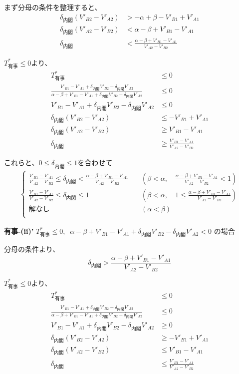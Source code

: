 \documentclass[main.tex]{subfiles}
\begin{document}
まず分母の条件を整理すると、
\begin{align*}
    \delta_{内閣}(V'_{B2} - V'_{A2}) &> -\alpha+\beta - V'_{B1}+V'_{A1} \\
    \delta_{内閣}(V'_{A2} - V'_{B2}) &< \alpha-\beta + V'_{B1}-V'_{A1}\\
    \delta_{内閣} &< \frac{\alpha-\beta + V'_{B1}-V'_{A1}}{V'_{A2} - V'_{B2}} 
\end{align*}

$T^*_{有事} \le 0$より、
\begin{align*}
    T^*_{有事} &\le 0 \\
    \frac{ V'_{B1} - V'_{A1} +\delta_{内閣}V'_{B2} - \delta_{内閣}V'_{A2} }{ \alpha-\beta + V'_{B1}-V'_{A1} + \delta_{内閣}V'_{B2} - \delta_{内閣}V'_{A2} } &\le 0 \\
    V'_{B1} - V'_{A1} +\delta_{内閣}V'_{B2} - \delta_{内閣}V'_{A2} &\le 0 \\
    \delta_{内閣}(V'_{B2} - V'_{A2}) &\le - V'_{B1} + V'_{A1}\\
    \delta_{内閣}(V'_{A2} - V'_{B2}) &\ge V'_{B1} - V'_{A1}\\
    \delta_{内閣} &\ge \frac{ V'_{B1} - V'_{A1} }{ V'_{A2} - V'_{B2} }
\end{align*}

これらと、$0 \le \delta_{内閣} \le 1$を合わせて
\begin{align*}
\begin{cases}
    \frac{ V'_{B1} - V'_{A1} }{ V'_{A2} - V'_{B2} } \le \delta_{内閣} <  \frac{\alpha-\beta + V'_{B1}-V'_{A1}}{V'_{A2} - V'_{B2}} \quad &(\beta < \alpha, \quad \frac{\alpha-\beta + V'_{B1}-V'_{A1}}{V'_{A2} - V'_{B2}} < 1) \\[1em]
    \frac{ V'_{B1} - V'_{A1} }{ V'_{A2} - V'_{B2} } \le \delta_{内閣} \le 1 \quad &(\beta < \alpha, \quad 1 \le \frac{\alpha-\beta + V'_{B1}-V'_{A1}}{V'_{A2} - V'_{B2}}) \\[1em]
    解なし \quad &(\alpha < \beta)\\[1em]
\end{cases}
\end{align*}




\bigskip
\textbf{有事-(ii)'}\; $T^*_{有事} \le 0,\;\; \alpha-\beta + V'_{B1}-V'_{A1} + \delta_{内閣}V'_{B2} - \delta_{内閣}V'_{A2} < 0$ の場合


分母の条件より、
$$\delta_{内閣} > \frac{\alpha-\beta + V'_{B1}-V'_{A1}}{V'_{A2} - V'_{B2}} $$

$T^*_{有事} \le 0$より、
\begin{align*}
    T^*_{有事} &\le 0 \\
    \frac{ V'_{B1} - V'_{A1} +\delta_{内閣}V'_{B2} - \delta_{内閣}V'_{A2} }{ \alpha-\beta + V'_{B1}-V'_{A1} + \delta_{内閣}V'_{B2} - \delta_{内閣}V'_{A2} } &\le 0 \\
    V'_{B1} - V'_{A1} +\delta_{内閣}V'_{B2} - \delta_{内閣}V'_{A2} &\ge 0 \\
    \delta_{内閣}(V'_{B2} - V'_{A2}) &\ge - V'_{B1} + V'_{A1}\\
    \delta_{内閣}(V'_{A2} - V'_{B2}) &\le V'_{B1} - V'_{A1}\\
    \delta_{内閣} &\le \frac{ V'_{B1} - V'_{A1} }{ V'_{A2} - V'_{B2} }
\end{align*}
\end{document}
